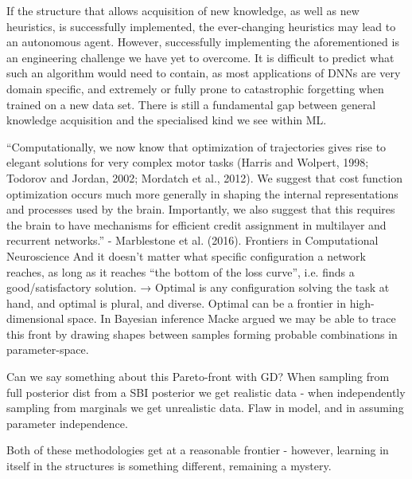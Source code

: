 \documentclass[mphil,deptreport,ianc]{infthesis} %
\begin{document}
If the structure that allows acquisition of new knowledge, as well as new heuristics, is successfully implemented, the ever-changing heuristics may lead to an autonomous agent. 
However, successfully implementing the aforementioned is an engineering challenge we have yet to overcome. It is difficult to predict what such an algorithm would need to contain, as most applications of DNNs are very domain specific, and extremely or fully prone to catastrophic forgetting when trained on a new data set.
There is still a fundamental gap between general knowledge acquisition and the specialised kind we see within ML.


“Computationally, we now know that optimization of trajectories gives rise to elegant solutions for very complex motor tasks (Harris and Wolpert, 1998; Todorov and Jordan, 2002; Mordatch et al., 2012). We suggest that cost function optimization occurs much more generally in shaping the internal representations and processes used by the brain. Importantly, we also suggest that this requires the brain to have mechanisms for efficient credit assignment in multilayer and recurrent networks.” - Marblestone et al. (2016). Frontiers in Computational Neuroscience
And it doesn’t matter what specific configuration a network reaches, as long as it reaches “the bottom of the loss curve”, i.e. finds a good/satisfactory solution. → Optimal is any configuration solving the task at hand, and optimal is plural, and diverse. Optimal can be a frontier in high-dimensional space. In Bayesian inference Macke argued we may be able to trace this front by drawing shapes between samples forming probable combinations in parameter-space.

Can we say something about this Pareto-front with GD?
When sampling from full posterior dist from a SBI posterior we get realistic data - when independently sampling from marginals we get unrealistic data. Flaw in model, and in assuming parameter independence.

Both of these methodologies get at a reasonable frontier - however, learning in itself in the structures is something different, remaining a mystery.
\end{document}
